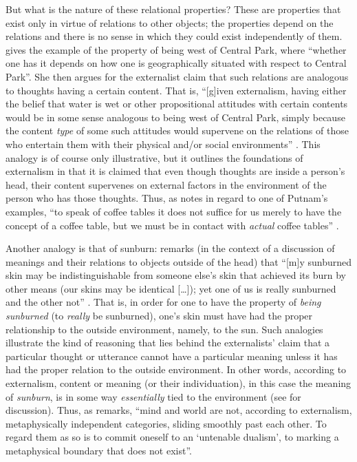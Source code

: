 But what is the nature of these relational properties? These are properties that exist only in virtue of relations to other objects; the properties depend on the relations and there is no sense in which they could exist independently of them. \citet[3]{Nuccetelli2003} gives the example of the property of being west of Central Park, where “whether one has it depends on how one is geographically situated with respect to Central Park”. She then argues for the externalist claim that such relations are analogous to thoughts having a certain content. That is, “[g]iven externalism, having either the belief that water is wet or other propositional attitudes with certain contents would be in some sense analogous to being west of Central Park, simply because the content \textit{type} of some such attitudes would supervene on the relations of those who entertain them with their physical and/or social environments” \citep[3, emphasis in original]{Nuccetelli2003}. This analogy is of course only illustrative, but it outlines the foundations of externalism in that it is claimed that even though thoughts are inside a person’s head, their content supervenes on external factors in the environment of the person who has those thoughts. Thus, as \citet{Ben-Menahem2005} notes in regard to one of Putnam’s examples, “to speak of coffee tables it does not suffice for us merely to have the concept of a coffee table, but we must be in contact with \textit{actual} coffee tables” \citep[10, emphasis in original]{Ben-Menahem2005}.

Another analogy is that of sunburn: \citet{Davidson1987} remarks (in the context of a discussion of meanings and their relations to objects outside of the head) that “[m]y sunburned skin may be indistinguishable from someone else’s skin that achieved its burn by other means (our skins may be identical […]); yet one of us is really sunburned and the other not” \citep[451--452]{Davidson1987}. That is, in order for one to have the property of \textit{being sunburned} (to \textit{really} be sunburned), one’s skin must have had the proper relationship to the outside environment, namely, to the sun. Such analogies illustrate the kind of reasoning that lies behind the externalists’ claim that a particular thought or utterance cannot have a particular meaning unless it has had the proper relation to the outside environment. In other words, according to externalism, content or meaning (or their individuation), in this case the meaning of \textit{sunburn}, is in some way \textit{essentially} tied to the environment (see \citealt{Egan1999} for discussion). Thus, as \citet[9--10]{McGinn1989} remarks, “mind and world are not, according to externalism, metaphysically independent categories, sliding smoothly past each other. To regard them as so is to commit oneself to an ‘untenable dualism’, to marking a metaphysical boundary that does not exist”.

